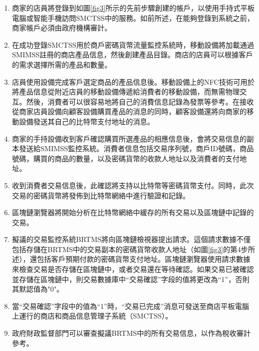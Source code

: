		\begin{enumerate}
			\item 商家的店員將登錄到如圖\ref{fig3}所示的先前步驟創建的帳戶，以使用手持式平板電腦或智能手機訪問SMCTSS中的服務。如前所述，在能夠登錄到系統之前，商家帳戶必須由政府機構審計。
			\item 在成功登錄SMCTSS用於商戶密碼貨幣流量監控系統時，移動設備將加載通過SMIMSS註冊的商店產品信息，然後創建產品目錄。商店的店員可以根據客戶的需求選擇所需的產品和數量。
			\item 店員使用設備完成客戶選定商品的產品信息後。移動設備上的NFC技術可用於將產品信息從附近店員的移動設備傳遞給消費者的移動設備，而無需物理交互。然後，消費者可以很容易地將自己的消費信息記錄為發票等參考。在接收從商家店員設備向顧客設備購買產品的消息的同時，顧客設備還將向商家的移動設備發送其自己的比特幣支付地址的消息。
			\item 商家的手持設備收到客戶確認購買所選產品的相應信息後，會將交易信息的副本發送給SMIMSS監控系統。消費者信息包括交易序列號，商戶ID號碼，商品號碼，購買的商品的數量，以及密碼貨幣的收款人地址以及消費者的支付地址。
			\item 收到消費者交易信息後，此確認將支持以比特幣等密碼貨幣支付。同時，此次交易的密碼貨幣將發佈到比特幣網絡中進行驗證和記錄。
			\item 區塊鏈瀏覽器將開始分析在比特幣網絡中緩存的所有交易以及區塊鏈中記錄的交易。
			\item 擬議的交易監控系統BRTMS將向區塊鏈檢視器提出請求。這個請求數據不僅包括存儲在BRTMS中的交易副本的密碼貨幣收款人地址（如圖\ref{fig3}的第4步所述），還包括客戶預期付款的密碼貨幣支付地址。區塊鏈瀏覽器使用請求數據來檢查交易是否存儲在區塊鏈中，或者交易還在等待確認。如果交易已被確認並存儲在區塊鏈中，則交易數據庫中“交易確認”字段的值將更改為“1”，否則其默認值為"0"。
			\item 當“交易確認”字段中的值為“1”時，“交易已完成”消息可發送至商店平板電腦上運行的商店和商品信息管理子系統（SMCTSS）。
			\item 政府財政監督部門可以審查擬議BRTMS中的所有交易信息，以作為稅收審計參考。
		\end{enumerate}

	
